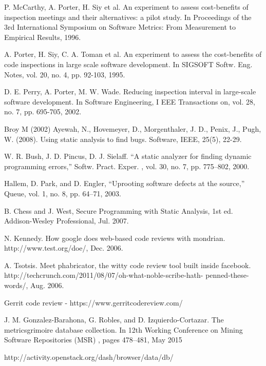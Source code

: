 \begin{thebibliography}{99.}
 P. McCarthy, A. Porter, H. Siy et al. An experiment to assess cost-benefits of inspection meetings and their 
alternatives: a pilot study. In Proceedings of the 3rd International Symposium on Software Metrics: From Measurement to Empirical 
Results, 1996. 

 A. Porter, H. Siy, C. A. Toman et al. An experiment to assess the cost-benefits of code inspections in 
large scale software development. In SIGSOFT Softw. Eng. Notes, vol. 20, no. 4, pp. 92-103, 1995. 

 D. E. Perry, A. Porter, M. W. Wade. Reducing inspection interval in large-scale software development. In Software 
Engineering, I EEE Transactions on, vol. 28, no. 7, pp. 695-705, 2002. 

 Broy M (2002) Ayewah, N., Hovemeyer, D., Morgenthaler, J. D., Penix, J., Pugh, W. (2008). 
Using static analysis to find bugs. Software, IEEE, 25(5), 22-29.

 W. R. Bush, J. D. Pincus, D. J. Sielaff. “A static
analyzer for finding dynamic programming errors,” Softw.
Pract. Exper.
, vol. 30, no. 7, pp. 775–802, 2000.

 Hallem, D. Park, and D. Engler, “Uprooting software
defects at the source,”
Queue, vol. 1, no. 8, pp. 64–71, 2003.

 B. Chess and J. West,
Secure Programming with Static
Analysis, 1st ed.  Addison-Wesley Professional, Jul. 2007.

 N. Kennedy.  How google does web-based code reviews with mondrian.
http://www.test.org/doe/, Dec. 2006.

 A.  Tsotsis.  Meet  phabricator,  the  witty  code  review  tool  built  inside
facebook.  http://techcrunch.com/2011/08/07/oh-what-noble-scribe-hath-
penned-these-words/, Aug. 2006.

 Gerrit code review - https://www.gerritcodereview.com/ 

 J.  M.  Gonzalez-Barahona,  G.  Robles,  and  D.  Izquierdo-Cortazar.   The
metricsgrimoire  database  collection.   In
12th  Working  Conference  on
Mining Software Repositories (MSR)
, pages 478–481, May 2015

 http://activity.openstack.org/dash/browser/data/db/


\end{thebibliography}
